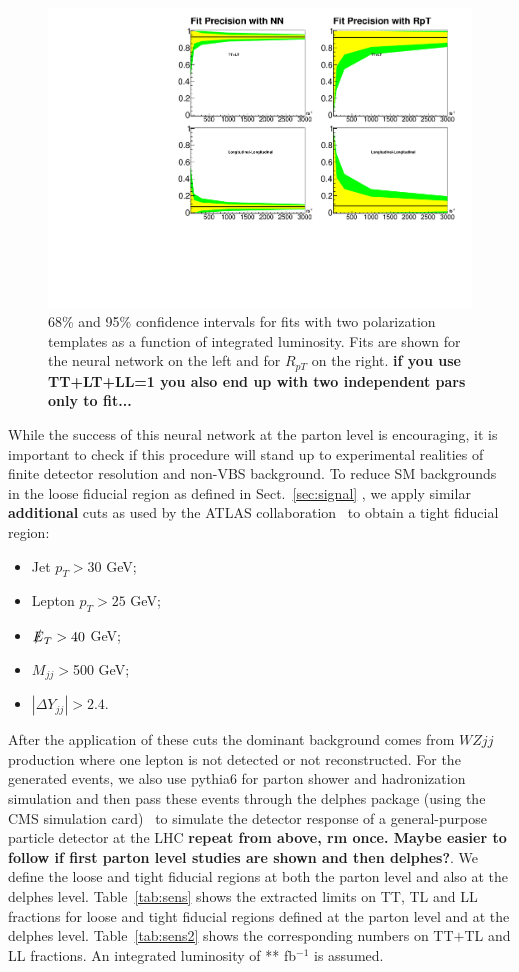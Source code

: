 \begin{figure}
\includegraphics[width=.45\textwidth]{./fig/sens_2.pdf}
\caption{\label{fig:sen_2} 68\% and 95\% confidence intervals for fits
  with two polarization templates as a function of integrated
  luminosity. Fits are shown for the neural network on the left and
  for $R_{pT}$ on the right. {\bf if you use TT+LT+LL=1 you also end
    up with two independent pars only to fit...}}
\end{figure}

While the success of this neural network at the parton level is
encouraging, it is important to check if this procedure will stand up
to experimental realities of finite detector resolution and non-VBS
background. To reduce SM backgrounds in the loose fiducial region as
defined in Sect.~\ref{sec:signal} , we apply similar {\bf additional}
cuts as used by the ATLAS collaboration~\cite{ATLAS_ssWW} to obtain a
tight fiducial region:

\begin{itemize}
\item Jet $p_T > 30$ GeV;
\item Lepton $p_T > 25$ GeV;
\item $\slashed{E}_T > 40$ GeV;
\item $M_{jj} > $500 GeV;
\item $|\Delta Y_{jj}| > 2.4 $.
\end{itemize}

After the application of these cuts the dominant background comes from
$WZjj$ production where one lepton is not detected or not
reconstructed.  For the generated \ssWW events, we also use {\sc
  pythia6} for parton shower and hadronization simulation and then
pass these events through the {\sc delphes} package (using the CMS
simulation card)~\cite{delphes} to simulate the detector response of a
general-purpose particle detector at the LHC {\bf repeat from above,
  rm once. Maybe easier to follow if first parton level studies are
  shown and then delphes?}.  We define the loose and tight fiducial
regions at both the parton level and also at the {\sc delphes} level.
Table~\ref{tab:sens} shows the extracted limits on TT, TL and LL
fractions for loose and tight fiducial regions defined at the parton
level and at the {\sc delphes} level.  Table~\ref{tab:sens2} shows the
corresponding numbers on TT$+$TL and LL fractions.  An integrated
luminosity of ** fb$^{-1}$ is assumed.

